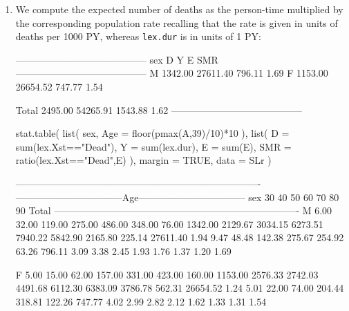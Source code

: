 \begin{enumerate}[resume]
    
\item We compute the expected number of deaths as the person-time
   multiplied by the corresponding population rate recalling that the
   rate is given in units of deaths per 1000 PY, whereas
   \texttt{lex.dur} is in units of 1 PY:
\begin{Schunk}
\begin{Soutput}
 ----------------------------------------- 
 sex           D        Y       E     SMR  
 ----------------------------------------- 
 M       1342.00 27611.40  796.11    1.69  
 F       1153.00 26654.52  747.77    1.54  
                                           
 Total   2495.00 54265.91 1543.88    1.62  
 ----------------------------------------- 
\end{Soutput}
\begin{Sinput}
 stat.table( list( sex, Age = floor(pmax(A,39)/10)*10 ), 
             list( D = sum(lex.Xst=="Dead"), 
                   Y = sum(lex.dur), 
                   E = sum(E), 
                 SMR = ratio(lex.Xst=="Dead",E) ), 
              margin = TRUE,
                data = SLr )
\end{Sinput}
\begin{Soutput}
 ---------------------------------------------------------------------------- 
        ---------------------------------Age--------------------------------- 
 sex          30      40       50       60       70      80      90    Total  
 ---------------------------------------------------------------------------- 
 M          6.00   32.00   119.00   275.00   486.00  348.00   76.00  1342.00  
         2129.67 3034.15  6273.51  7940.22  5842.90 2165.80  225.14 27611.40  
            1.94    9.47    48.48   142.38   275.67  254.92   63.26   796.11  
            3.09    3.38     2.45     1.93     1.76    1.37    1.20     1.69  
                                                                              
 F          5.00   15.00    62.00   157.00   331.00  423.00  160.00  1153.00  
         2576.33 2742.03  4491.68  6112.30  6383.09 3786.78  562.31 26654.52  
            1.24    5.01    22.00    74.00   204.44  318.81  122.26   747.77  
            4.02    2.99     2.82     2.12     1.62    1.33    1.31     1.54  
                                                                              

\end{Soutput}
\end{Schunk}
\end{enumerate}
